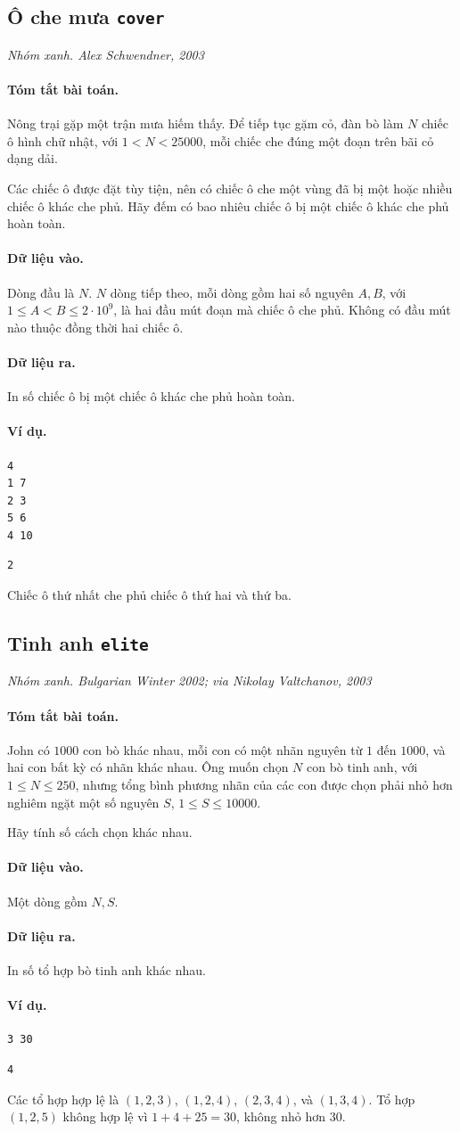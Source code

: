 \documentclass[11pt]{article}
\newcommand{\problem}[4]{%
  \subsection[#1 (#2)]{#1 \hfill {\normalsize\texttt{#2}}}%
  \noindent\textit{#3. #4}\par\smallskip
}
\newcommand{\iosec}[1]{\paragraph{#1}}
\begin{document}
\problem{Ô che mưa}{cover}{Nhóm xanh}{Alex Schwendner, 2003}

\iosec{Tóm tắt bài toán.}
Nông trại gặp một trận mưa hiếm thấy. Để tiếp tục gặm cỏ, đàn bò làm
\(N\) chiếc ô hình chữ nhật, với \(1<N<25000\), mỗi chiếc che đúng một đoạn
trên bãi cỏ dạng dải.

Các chiếc ô được đặt tùy tiện, nên có chiếc ô che một vùng đã bị một hoặc
nhiều chiếc ô khác che phủ. Hãy đếm có bao nhiêu chiếc ô bị một chiếc ô khác
che phủ hoàn toàn.

\iosec{Dữ liệu vào.}
Dòng đầu là \(N\). \(N\) dòng tiếp theo, mỗi dòng gồm hai số nguyên
\(A,B\), với \(1\le A<B\le 2\cdot 10^9\), là hai đầu mút đoạn mà chiếc ô che
phủ. Không có đầu mút nào thuộc đồng thời hai chiếc ô.

\iosec{Dữ liệu ra.}
In số chiếc ô bị một chiếc ô khác che phủ hoàn toàn.

\iosec{Ví dụ.}
\begin{verbatim}
4
1 7
2 3
5 6
4 10
\end{verbatim}

\begin{verbatim}
2
\end{verbatim}

Chiếc ô thứ nhất che phủ chiếc ô thứ hai và thứ ba.

\problem{Tinh anh}{elite}{Nhóm xanh}{Bulgarian Winter 2002; via Nikolay Valtchanov, 2003}

\iosec{Tóm tắt bài toán.}
John có \(1000\) con bò khác nhau, mỗi con có một nhãn nguyên từ \(1\) đến
\(1000\), và hai con bất kỳ có nhãn khác nhau. Ông muốn chọn \(N\) con bò tinh
anh, với \(1\le N\le 250\), nhưng tổng bình phương nhãn của các con được chọn
phải nhỏ hơn nghiêm ngặt một số nguyên \(S\), \(1\le S\le 10000\).

Hãy tính số cách chọn khác nhau.

\iosec{Dữ liệu vào.}
Một dòng gồm \(N,S\).

\iosec{Dữ liệu ra.}
In số tổ hợp bò tinh anh khác nhau.

\iosec{Ví dụ.}
\begin{verbatim}
3 30
\end{verbatim}

\begin{verbatim}
4
\end{verbatim}

Các tổ hợp hợp lệ là \((1,2,3)\), \((1,2,4)\), \((2,3,4)\), và
\((1,3,4)\). Tổ hợp \((1,2,5)\) không hợp lệ vì \(1+4+25=30\), không nhỏ hơn
\(30\).
\end{document}
